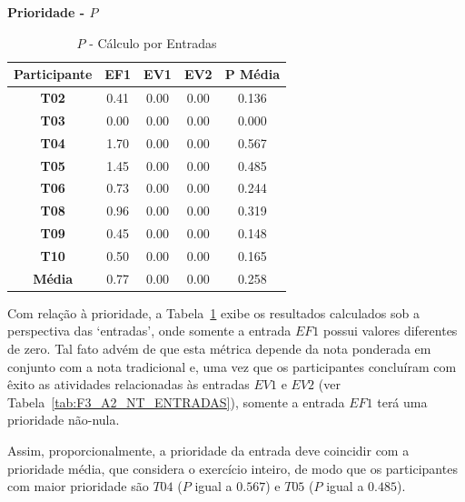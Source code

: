 \textbf{Prioridade - $P$}

\begin{table}[htbp]
	\centering
	\caption{$P$ - Cálculo por Entradas}
	\begin{tabular}{|c|c|c|c|c|}
		\hline
		\rowcolor[HTML]{D0CECE} 
		\textbf{Participante} & \textbf{EF1} & \textbf{EV1} & \textbf{EV2} & \textbf{P Média} \\ \hline
		\textbf{T02}          & 0.41         & 0.00         & 0.00         & 0.136            \\ \hline
		\rowcolor[HTML]{F2F2F2} 
		\textbf{T03}          & 0.00         & 0.00         & 0.00         & 0.000            \\ \hline
		\textbf{T04}          & 1.70         & 0.00         & 0.00         & 0.567            \\ \hline
		\rowcolor[HTML]{F2F2F2} 
		\textbf{T05}          & 1.45         & 0.00         & 0.00         & 0.485            \\ \hline
		\textbf{T06}          & 0.73         & 0.00         & 0.00         & 0.244            \\ \hline
		\rowcolor[HTML]{F2F2F2} 
		\textbf{T08}          & 0.96         & 0.00         & 0.00         & 0.319            \\ \hline
		\textbf{T09}          & 0.45         & 0.00         & 0.00         & 0.148            \\ \hline
		\rowcolor[HTML]{F2F2F2} 
		\textbf{T10}          & 0.50         & 0.00         & 0.00         & 0.165            \\ \hline
		\rowcolor[HTML]{D0CECE} 
		\textbf{Média}        & 0.77         & 0.00         & 0.00         & 0.258            \\ \hline
	\end{tabular}
	\label{tab:F3_A2_P_ENTRADAS}
\end{table}

Com relação à prioridade, a Tabela~\ref{tab:F3_A2_P_ENTRADAS} exibe os resultados calculados sob a perspectiva das `entradas', onde somente a entrada $EF1$ possui valores diferentes de zero. Tal fato advém de que esta métrica depende da nota ponderada em conjunto com a nota tradicional e, uma vez que os participantes concluíram com êxito as atividades relacionadas às entradas $EV1$ e $EV2$ (ver Tabela~\ref{tab:F3_A2_NT_ENTRADAS}), somente a entrada $EF1$ terá uma prioridade não-nula.

Assim, proporcionalmente, a prioridade da entrada deve coincidir com a prioridade média, que considera o exercício inteiro, de modo que os participantes com maior prioridade são $T04$ ($P$ igual a $0.567$) e $T05$ ($P$ igual a $0.485$).

